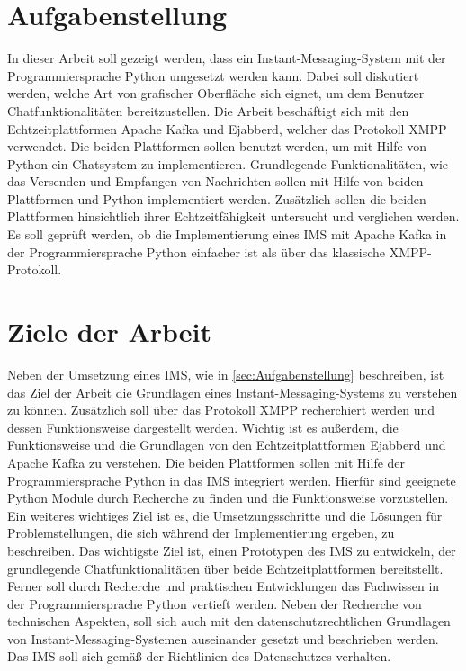 \documentclass[a4paper,titlepage,halfparskip,12pt]{scrreprt}
\begin{document}
\begin{onehalfspacing}
\section{Aufgabenstellung}
\label{sec:Aufgabenstellung}

In dieser Arbeit soll gezeigt werden, dass ein Instant-Messaging-System mit der Programmiersprache Python umgesetzt werden kann. Dabei soll diskutiert werden, welche Art von grafischer Oberfläche sich eignet, um dem Benutzer Chatfunktionalitäten bereitzustellen. Die Arbeit beschäftigt sich mit den Echtzeitplattformen Apache Kafka und Ejabberd, welcher das Protokoll \acs{XMPP} verwendet. Die beiden Plattformen sollen benutzt werden, um mit Hilfe von Python ein Chatsystem zu implementieren. Grundlegende Funktionalitäten, wie das Versenden und Empfangen von Nachrichten sollen mit Hilfe von beiden Plattformen und Python implementiert werden. Zusätzlich sollen die beiden Plattformen hinsichtlich ihrer Echtzeitfähigkeit untersucht und verglichen werden. Es soll geprüft werden, ob die Implementierung eines \acs{IMS} mit Apache Kafka in der Programmiersprache Python einfacher ist als über das klassische \acs{XMPP}-Protokoll.

\section{Ziele der Arbeit}
\label{sec:Ziele}

Neben der Umsetzung eines \acs{IMS}, wie in \autoref{sec:Aufgabenstellung} beschreiben, ist das Ziel der Arbeit die Grundlagen eines Instant-Messaging-Systems zu verstehen zu können. Zusätzlich soll über das Protokoll \acs{XMPP} recherchiert werden und dessen Funktionsweise dargestellt werden. Wichtig ist es außerdem, die Funktionsweise und die Grundlagen von den Echtzeitplattformen Ejabberd und Apache Kafka zu verstehen. Die beiden Plattformen sollen mit Hilfe der Programmiersprache Python in das \acs{IMS} integriert werden. Hierfür sind geeignete Python Module durch Recherche zu finden und die Funktionsweise vorzustellen. Ein weiteres wichtiges Ziel ist es, die Umsetzungsschritte und die Lösungen für Problemstellungen, die sich während der Implementierung ergeben, zu beschreiben. Das wichtigste Ziel ist, einen Prototypen des \acs{IMS} zu entwickeln, der grundlegende Chatfunktionalitäten über beide Echtzeitplattformen bereitstellt. Ferner soll durch Recherche und praktischen Entwicklungen das Fachwissen in der Programmiersprache Python vertieft werden. Neben der Recherche von technischen Aspekten, soll sich auch mit den datenschutzrechtlichen Grundlagen von Instant-Messaging-Systemen auseinander gesetzt und beschrieben werden. Das \acs{IMS} soll sich gemäß der Richtlinien des Datenschutzes verhalten.


\end{onehalfspacing}
\end{document}

